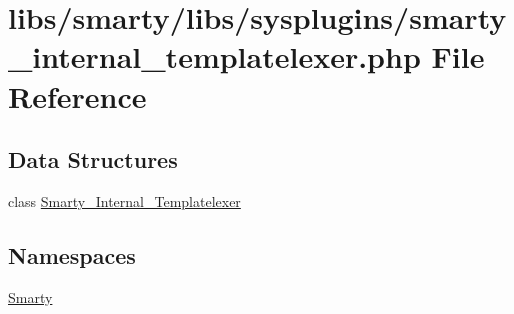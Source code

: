 \hypertarget{smarty__internal__templatelexer_8php}{}\section{libs/smarty/libs/sysplugins/smarty\+\_\+internal\+\_\+templatelexer.php File Reference}
\label{smarty__internal__templatelexer_8php}
\subsection*{Data Structures}
\begin{DoxyCompactItemize}
\item 
class \hyperlink{class_smarty___internal___templatelexer}{Smarty\+\_\+\+Internal\+\_\+\+Templatelexer}
\end{DoxyCompactItemize}
\subsection*{Namespaces}
\begin{DoxyCompactItemize}
\item 
 \hyperlink{namespace_smarty}{Smarty}
\end{DoxyCompactItemize}
